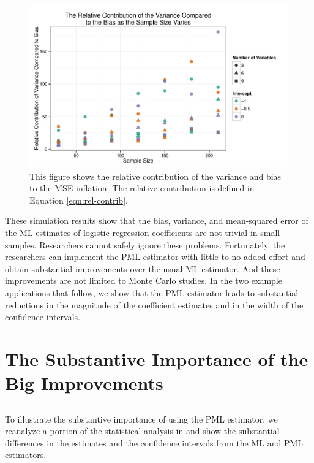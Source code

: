 \documentclass[12pt]{article}
\begin{document}
\begin{figure}[h]
\begin{center}
\includegraphics[scale = 0.7]{figs/relcontrib-n-scatter.pdf}
\caption{This figure shows the relative contribution of the variance and bias to the MSE inflation. The relative contribution is defined in Equation \ref{eqn:rel-contrib}.}\label{fig:relcontrib-n-scatter}
\end{center}
\end{figure}

These simulation results show that the bias, variance, and mean-squared error of the ML estimates of logistic regression coefficients are not trivial in small samples.
Researchers cannot safely ignore these problems.
Fortunately, the researchers can implement the PML estimator with little to no added effort and obtain substantial improvements over the usual ML estimator. 
And these improvements are not limited to Monte Carlo studies. 
In the two example applications that follow, we show that the PML estimator leads to substantial reductions in the magnitude of the coefficient estimates and in the width of the confidence intervals.

\section*{The Substantive Importance of the Big Improvements}

\subsection*{\cite{Weisiger2014}}

To illustrate the substantive importance of using the PML estimator, we reanalyze a portion of the statistical analysis in \cite{Weisiger2014} and show the substantial differences in the estimates and the confidence intervals from the ML and PML estimators.
\end{document}
